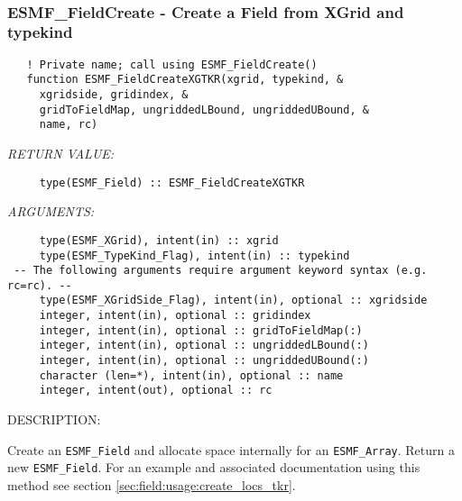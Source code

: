  
\mbox{}\hrulefill\ 
 
\subsubsection [ESMF\_FieldCreate] {ESMF\_FieldCreate - Create a Field from XGrid and typekind}


\begin{verbatim}   ! Private name; call using ESMF_FieldCreate()
   function ESMF_FieldCreateXGTKR(xgrid, typekind, &
     xgridside, gridindex, &
     gridToFieldMap, ungriddedLBound, ungriddedUBound, &
     name, rc)\end{verbatim}{\em RETURN VALUE:}
\begin{verbatim}     type(ESMF_Field) :: ESMF_FieldCreateXGTKR\end{verbatim}{\em ARGUMENTS:}
\begin{verbatim}     type(ESMF_XGrid), intent(in) :: xgrid
     type(ESMF_TypeKind_Flag), intent(in) :: typekind
 -- The following arguments require argument keyword syntax (e.g. rc=rc). --
     type(ESMF_XGridSide_Flag), intent(in), optional :: xgridside
     integer, intent(in), optional :: gridindex
     integer, intent(in), optional :: gridToFieldMap(:)
     integer, intent(in), optional :: ungriddedLBound(:)
     integer, intent(in), optional :: ungriddedUBound(:)
     character (len=*), intent(in), optional :: name
     integer, intent(out), optional :: rc\end{verbatim}
{\sf DESCRIPTION:\\ }


   Create an {\tt ESMF\_Field} and allocate space internally for an
   {\tt ESMF\_Array}. Return a new {\tt ESMF\_Field}. For an example and
   associated documentation using this method see section
   \ref{sec:field:usage:create_locs_tkr}.
  
